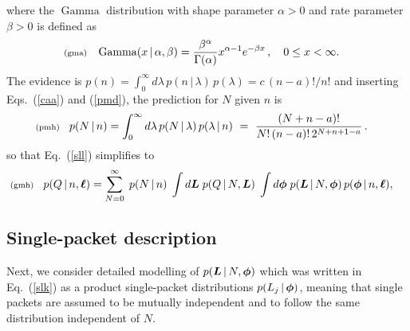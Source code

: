 \documentclass[11pt]{article}
\newcommand{\lleq}[1]{\label{#1} }
\renewcommand{\lleq}[1]{\label{#1} {\scriptstyle {\rm (#1)}} \hspace*{2ex} }
\newcommand{\cond}{\,|\,}
\DeclareMathOperator{\GammaDist}{Gamma}
\begin{document}
where the $\GammaDist$ distribution with shape parameter $\alpha > 0$ and
rate parameter $\beta > 0$ is defined as
\begin{align}
  \lleq{gma}
  \GammaDist(x\cond \alpha, \beta) 
  &= \frac{\beta^\alpha}{\Gamma(\alpha)} x^{\alpha-1} e^{-\beta x}\,,
  \quad 0 \leq x < \infty.
\end{align}
The evidence is 
$p(n) =  \int_0^\infty d\lambda\, p(n\cond\lambda)\,p(\lambda) = c\,(n-a)!/n!$
and inserting Eqs.~(\ref{caa}) and (\ref{pmd}), the prediction for $N$
given $n$ is
\begin{align}
  \lleq{pmh}
  p(N\cond n) %
  &= \int_0^\infty d\lambda\, p(N\cond\lambda)\,p(\lambda\cond n)
  \ =\ \frac{(N+n-a)!}{N!\,(n-a)!\,2^{N+n+1-a}} \, .
\end{align}
so that Eq.~(\ref{sll}) simplifies to
\begin{align}
  \lleq{gmh}
  p(Q\cond n,\bml)
  &= \sum_{N=0}^\infty \;
    p(N\cond n)\;
    \int d\bmL\;
    p(Q\cond N,\bmL)\;
    \int d\bmphi\;
    p(\bmL\cond N,\bmphi)\,
    p(\bmphi\cond n,\bml),
\end{align}

\subsection{Single-packet description}

Next, we consider detailed modelling of $p(\bmL\cond N,\bmphi)$ which
was written in Eq.~(\ref{slk}) as a product single-packet
distributions $p(L_j\cond \bmphi)$, meaning that single packets are
assumed to be mutually independent and to follow the same distribution
independent of $N$. 
\end{document}
